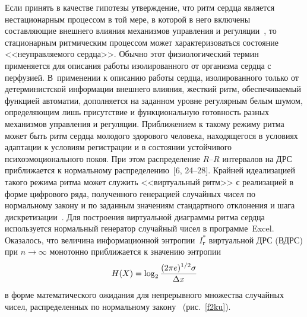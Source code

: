 \begin{multicols}{2}
Если принять в качестве гипотезы утверждение, что ритм сердца является 
нестационарным процессом в той мере, в которой в него включены 
составляющие внешнего влияния механизмов управления и 
регуляции~\cite{2ku, 6ku}, то стационарным ритмическим процессом может 
характеризоваться состояние <<неуправляемого сердца>>. Обычно этот 
физиологический термин применяется для описания работы изолированного от 
организма сердца с перфузией. В~применении к описанию работы сердца, 
изолированного только от детерминистской информации внешнего влияния, 
жесткий ритм, обеспечиваемый функцией автоматии, дополняется на заданном 
уровне регулярным белым шумом, определяющим лишь присутствие и 
функциональную готовность разных механизмов управления и регуляции. 
Приближением к такому режиму ритма может быть ритм сердца молодого 
здорового человека, находящегося в условиях адаптации к условиям 
регистрации и в состоянии устойчивого психоэмоционального покоя. При этом 
распределение $R$--$R$ интервалов на ДРС приближается к нормальному 
распределению~[6, 24--28]. Крайней идеализацией такого режима ритма может 
служить <<виртуальный ритм>> с реализацией в форме цифрового ряда, 
полученного генерацией случайных чисел по нормальному закону и по 
заданным значениям стандартного отклонения и шага 
дискретизации~\cite{6ku,  28ku}. Для построения виртуальной диаграммы 
ритма сердца используется нормальный генератор случайный чисел в 
программе~Excel. Оказалось, что величина информационной 
энтропии~$I^*_{\mathrm{г}}$ виртуальной ДРС (ВДРС) 
при $n\rightarrow \infty$ монотонно приближается к значению энтропии 
$$
H(X) = \log_2\displaystyle\frac{\displaystyle (2\pi e)^{1/2}\sigma\mathstrut}{\displaystyle \Delta x\mathstrut}
$$ 
в форме математического ожидания для непрерывного 
множества случайных чисел, распределенных по нормальному 
закону~\cite{6ku, 15ku} (рис.~\ref{f2ku}). 
\begin{figure*} %
  \vspace*{1pt}
\begin{center}
\mbox{%
\epsfxsize=164.59mm
}
\end{center}
\vspace*{-6pt}
\begin{minipage}[t]{79.5mm}
\end{minipage}
\hfill
\vspace*{-6pt}
\begin{minipage}[t]{79.5mm}
  \end{minipage}
  \vspace*{9pt}
  \end{figure*}


\end{multicols}
